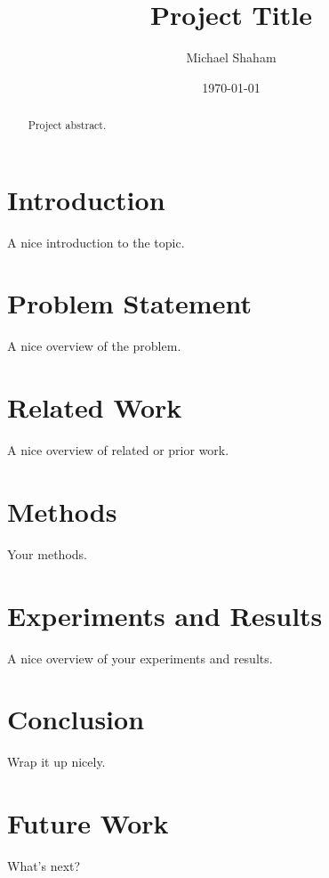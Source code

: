 \documentclass[12pt]{article}
\title{Project Title}
\author{Michael Shaham}
\date{\monthyeardate\today}
\begin{document}
\maketitle

\begin{abstract}

Project abstract.

\end{abstract}

\newpage
\tableofcontents
\newpage

\section{Introduction}

A nice introduction to the topic. \cite{SW:57}

\section{Problem Statement}

A nice overview of the problem.

\section{Related Work}

A nice overview of related or prior work.

\section{Methods}

Your methods.

\section{Experiments and Results}

A nice overview of your experiments and results.

\section{Conclusion}

Wrap it up nicely.

\section{Future Work}

What's next?

\newpage


\end{document}

